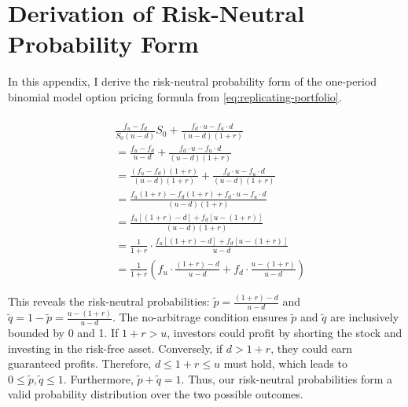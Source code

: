 \documentclass[english,12pt,a4paper,pdftex,sci,utf8]{aaltothesis}
\begin{document}
\appendix
\section{Derivation of Risk-Neutral Probability Form}  %
\label{appendix:risk_neutral_derivation}

In this appendix, I derive the risk-neutral probability form of the one-period binomial model option pricing formula from \eqref{eq:replicating-portfolio}.

\begin{align}
\nonumber\\[0.7em]
&\frac{f_u - f_d}{S_0(u-d)}S_0 + \frac{f_d \cdot u-f_u \cdot d}{(u-d)(1+r)} \nonumber\\[0.7em]
&=\frac{f_u - f_d}{u-d} + \frac{f_d \cdot u-f_u \cdot d}{(u-d)(1+r)} \nonumber\\[0.7em]
&=\frac{(f_u - f_d)(1+r)}{(u-d)(1+r)} + \frac{f_d \cdot u - f_u \cdot d}{(u-d)(1+r)} \nonumber\\[0.7em]
&=\frac{f_u(1+r) - f_d(1+r) + f_d \cdot u - f_u \cdot d}{(u-d)(1+r)} \nonumber\\[0.7em]
&= \frac{f_u[(1+r) - d] + f_d[u - (1+r)]}{(u-d)(1+r)} \nonumber\\[0.7em]
&= \frac{1}{1+r} \cdot \frac{f_u[(1+r) - d] + f_d[u - (1+r)]}{u-d} \nonumber\\[0.7em]
&= \frac{1}{1+r} \left( f_u \cdot \frac{(1+r) - d}{u-d} + f_d \cdot \frac{u - (1+r)}{u-d} \right)\nonumber
\end{align}

This reveals the risk-neutral probabilities: $\tilde p = \frac{(1+r) - d}{u-d}$ and \mbox{$\tilde q=1-\tilde p = \frac{u - (1+r)}{u-d}$}. The no-arbitrage condition ensures $\tilde p$ and $\tilde q$ are inclusively bounded by 0 and 1. If $1+r > u$, investors could profit by shorting the stock and investing in the risk-free asset. Conversely, if $d > 1+r$, they could earn guaranteed profits. Therefore, $d \leq 1+r \leq u$ must hold, which leads to $0\leq \tilde p, \tilde q \leq 1$. Furthermore, $\tilde p + \tilde q = 1$. Thus, our risk-neutral probabilities form a valid probability distribution over the two possible outcomes.
\end{document}
